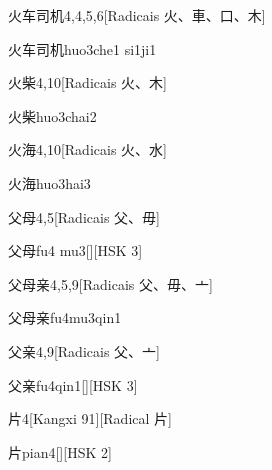 \begin{entry}{火车司机}{4,4,5,6}[Radicais ⽕、⾞、⼝、⽊]
  \begin{phonetics}{火车司机}{huo3che1 si1ji1}
  \end{phonetics}
\end{entry}

\begin{entry}{火柴}{4,10}[Radicais ⽕、⽊]
  \begin{phonetics}{火柴}{huo3chai2}
  \end{phonetics}
\end{entry}

\begin{entry}{火海}{4,10}[Radicais ⽕、⽔]
  \begin{phonetics}{火海}{huo3hai3}
  \end{phonetics}
\end{entry}

\begin{entry}{父母}{4,5}[Radicais ⽗、⽏]
  \begin{phonetics}{父母}{fu4 mu3}[][HSK 3]
  \end{phonetics}
\end{entry}

\begin{entry}{父母亲}{4,5,9}[Radicais ⽗、⽏、⼇]
  \begin{phonetics}{父母亲}{fu4mu3qin1}
  \end{phonetics}
\end{entry}

\begin{entry}{父亲}{4,9}[Radicais ⽗、⼇]
  \begin{phonetics}{父亲}{fu4qin1}[][HSK 3]
  \end{phonetics}
\end{entry}

\begin{entry}{片}{4}[Kangxi 91][Radical ⽚]
  \begin{phonetics}{片}{pian4}[][HSK 2]
  \end{phonetics}
\end{entry}

